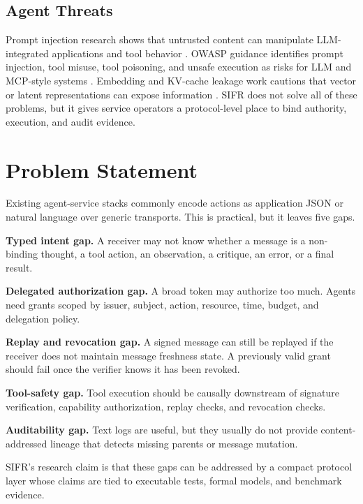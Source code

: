 \documentclass[runningheads]{llncs}
\begin{document}
\subsection{Agent Threats}

Prompt injection research shows that untrusted content can manipulate LLM-integrated applications and tool behavior \cite{greshake2023indirectpi,liu2024promptinjection}. OWASP guidance identifies prompt injection, tool misuse, tool poisoning, and unsafe execution as risks for LLM and MCP-style systems \cite{owasp2025llmtop10,owasp2026mcptop10}. Embedding and KV-cache leakage work cautions that vector or latent representations can expose information \cite{morris2023embeddingprivacy,luo2026shadowcache}. SIFR does not solve all of these problems, but it gives service operators a protocol-level place to bind authority, execution, and audit evidence.

\section{Problem Statement}

Existing agent-service stacks commonly encode actions as application JSON or natural language over generic transports. This is practical, but it leaves five gaps.

\textbf{Typed intent gap.} A receiver may not know whether a message is a non-binding thought, a tool action, an observation, a critique, an error, or a final result.

\textbf{Delegated authorization gap.} A broad token may authorize too much. Agents need grants scoped by issuer, subject, action, resource, time, budget, and delegation policy.

\textbf{Replay and revocation gap.} A signed message can still be replayed if the receiver does not maintain message freshness state. A previously valid grant should fail once the verifier knows it has been revoked.

\textbf{Tool-safety gap.} Tool execution should be causally downstream of signature verification, capability authorization, replay checks, and revocation checks.

\textbf{Auditability gap.} Text logs are useful, but they usually do not provide content-addressed lineage that detects missing parents or message mutation.

SIFR's research claim is that these gaps can be addressed by a compact protocol layer whose claims are tied to executable tests, formal models, and benchmark evidence.
\end{document}
